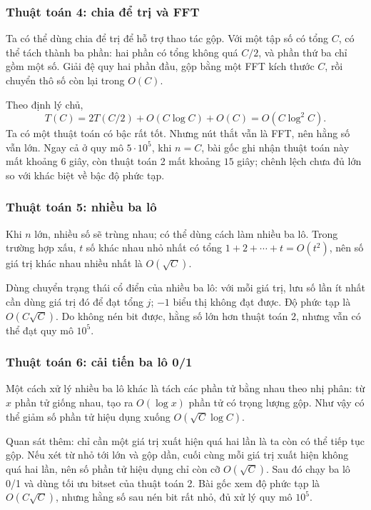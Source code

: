 \documentclass[11pt]{article}
\begin{document}
\subsubsection{Thuật toán 4: chia để trị và FFT}

Ta có thể dùng chia để trị để hỗ trợ thao tác gộp. Với một tập số có tổng \(C\),
có thể tách thành ba phần: hai phần có tổng không quá \(C/2\), và phần thứ ba
chỉ gồm một số. Giải đệ quy hai phần đầu, gộp bằng một FFT kích thước \(C\),
rồi chuyển thô số còn lại trong \(O(C)\).

Theo định lý chủ,
\[
  T(C)=2T(C/2)+O(C\log C)+O(C)=O(C\log^2 C).
\]
Ta có một thuật toán có bậc rất tốt. Nhưng nút thắt vẫn là FFT, nên hằng số
vẫn lớn. Ngay cả ở quy mô \(5\cdot10^5\), khi \(n=C\), bài gốc ghi nhận thuật
toán này mất khoảng \(6\) giây, còn thuật toán 2 mất khoảng \(15\) giây; chênh
lệch chưa đủ lớn so với khác biệt về bậc độ phức tạp.

\subsubsection{Thuật toán 5: nhiều ba lô}

Khi \(n\) lớn, nhiều số sẽ trùng nhau; có thể dùng cách làm nhiều ba lô. Trong
trường hợp xấu, \(t\) số khác nhau nhỏ nhất có tổng \(1+2+\cdots+t=O(t^2)\),
nên số giá trị khác nhau nhiều nhất là \(O(\sqrt C)\).

Dùng chuyển trạng thái cổ điển của nhiều ba lô: với mỗi giá trị, lưu số lần ít
nhất cần dùng giá trị đó để đạt tổng \(j\); \(-1\) biểu thị không đạt được.
Độ phức tạp là \(O(C\sqrt C)\). Do không nén bit được, hằng số lớn hơn thuật
toán 2, nhưng vẫn có thể đạt quy mô \(10^5\).

\subsubsection{Thuật toán 6: cải tiến ba lô 0/1}

Một cách xử lý nhiều ba lô khác là tách các phần tử bằng nhau theo nhị phân:
từ \(x\) phần tử giống nhau, tạo ra \(O(\log x)\) phần tử có trọng lượng gộp.
Như vậy có thể giảm số phần tử hiệu dụng xuống \(O(\sqrt C\log C)\).

Quan sát thêm: chỉ cần một giá trị xuất hiện quá hai lần là ta còn có thể tiếp
tục gộp. Nếu xét từ nhỏ tới lớn và gộp dần, cuối cùng mỗi giá trị xuất hiện
không quá hai lần, nên số phần tử hiệu dụng chỉ còn cỡ \(O(\sqrt C)\). Sau đó
chạy ba lô 0/1 và dùng tối ưu bitset của thuật toán 2. Bài gốc xem độ phức tạp
là \(O(C\sqrt C)\), nhưng hằng số sau nén bit rất nhỏ, đủ xử lý quy mô \(10^5\).
\end{document}
